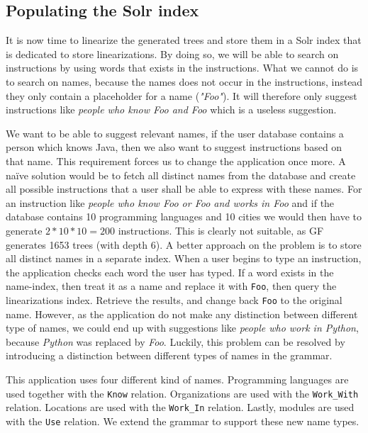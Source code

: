 \subsection{Populating the Solr index}
It is now time to linearize the generated trees and store them in a Solr index that is dedicated to store linearizations. By doing so, we will be able to search on instructions by using words that exists in the instructions. What we cannot do is to search on names, because the names does not occur in the instructions, instead they only contain a placeholder for a name (\emph{"Foo"}). It will therefore only suggest instructions like \emph{people who know Foo and Foo} which is a useless suggestion.

We want to be able to suggest relevant names, if the user database contains a person which knows Java, then we also want to suggest instructions based on that name. This requirement forces us to change the application once more. 
\newline
\newline
A na{\"i}ve solution would be to fetch all distinct names from the database and create all possible instructions that a user shall be able to express with these names. For an instruction like \emph{people who know Foo or Foo and works in Foo} and if the database contains 10 programming languages and 10 cities we would then have to generate $2*10*10=200$ instructions. This is clearly not suitable, as GF generates 1653 trees (with depth 6).
\newline
\newline
A better approach on the problem is to store all distinct names in a separate index. When a user begins to type an instruction, the application checks each word the user has typed. If a word exists in the name-index, then treat it as a name and replace it with \texttt{Foo}, then query the linearizations index. Retrieve the results, and change back \texttt{Foo} to the original name. However, as the application do not make any distinction between different type of names, we could end up with suggestions like \emph{people who work in Python}, because \emph{Python} was replaced by \emph{Foo}. Luckily, this problem can be resolved by introducing a distinction between different types of names in the grammar.

This application uses four different kind of names. Programming languages are used together with the \texttt{Know} relation. Organizations are used with the \texttt{Work\_With} relation. Locations are used with the \texttt{Work\_In} relation. Lastly, modules are used with the \texttt{Use} relation. We extend the grammar to support these new name types.

